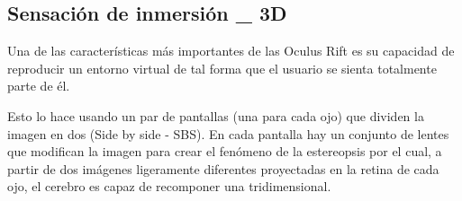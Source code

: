\documentclass[twoside, 12pt]{epstfg}
\begin{document}
%
%
%
%
%
%
%
%
%
%
%

\subsection{Sensación de inmersión \_ 3D}

Una de las características más importantes de las Oculus Rift es su capacidad de reproducir un entorno virtual de tal forma que el usuario se sienta totalmente parte de él.

Esto lo hace usando un par de pantallas (una para cada ojo) que dividen la imagen en dos (Side by side - SBS). En cada pantalla hay un conjunto de lentes que modifican la imagen para crear el fenómeno de la estereopsis por el cual, a partir de dos imágenes ligeramente diferentes proyectadas en la retina de cada ojo, el cerebro es capaz de recomponer una tridimensional.
\end{document}
